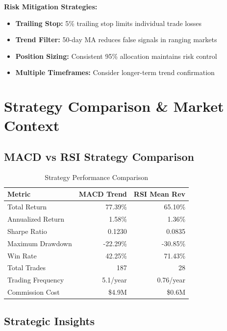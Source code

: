 \documentclass[11pt,a4paper]{article}
\begin{document}
\textbf{Risk Mitigation Strategies:}
\begin{itemize}
    \item \textbf{Trailing Stop:} 5\% trailing stop limits individual trade losses
    \item \textbf{Trend Filter:} 50-day MA reduces false signals in ranging markets
    \item \textbf{Position Sizing:} Consistent 95\% allocation maintains risk control
    \item \textbf{Multiple Timeframes:} Consider longer-term trend confirmation
\end{itemize}

\newpage

\section{Strategy Comparison \& Market Context}

\subsection{MACD vs RSI Strategy Comparison}

\begin{table}[H]
\centering
\begin{tabular}{lrr}
\toprule
\textbf{Metric} & \textbf{MACD Trend} & \textbf{RSI Mean Rev} \\
\midrule
Total Return & \textcolor{profit}{77.39\%} & 65.10\% \\
Annualized Return & \textcolor{profit}{1.58\%} & 1.36\% \\
Sharpe Ratio & \textcolor{profit}{0.1230} & 0.0835 \\
Maximum Drawdown & \textcolor{profit}{-22.29\%} & -30.85\% \\
Win Rate & 42.25\% & \textcolor{profit}{71.43\%} \\
Total Trades & 187 & \textcolor{profit}{28} \\
Trading Frequency & 5.1/year & \textcolor{profit}{0.76/year} \\
Commission Cost & \$4.9M & \textcolor{profit}{\$0.6M} \\
\bottomrule
\end{tabular}
\caption{Strategy Performance Comparison}
\end{table}

\subsection{Strategic Insights}
\end{document}
